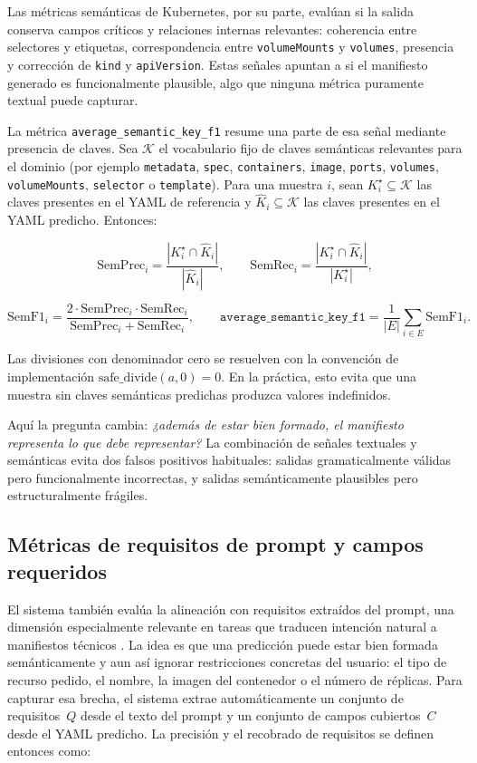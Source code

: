 Las métricas semánticas de Kubernetes, por su parte, evalúan si la salida conserva campos críticos y relaciones internas relevantes: coherencia entre
selectores y etiquetas, correspondencia entre \texttt{volumeMounts} y \texttt{volumes}, presencia y corrección de \texttt{kind} y \texttt{apiVersion}.
Estas señales apuntan a si el manifiesto generado es funcionalmente plausible, algo que ninguna métrica puramente textual puede capturar.

La métrica \texttt{average\_semantic\_key\_f1} resume una parte de esa señal mediante presencia de claves. Sea \(\mathcal{K}\) el vocabulario fijo de claves semánticas relevantes
para el dominio (por ejemplo \texttt{metadata}, \texttt{spec}, \texttt{containers}, \texttt{image}, \texttt{ports}, \texttt{volumes}, \texttt{volumeMounts},
\texttt{selector} o \texttt{template}). Para una muestra \(i\), sean \(K_i^\star \subseteq \mathcal{K}\) las claves presentes en el YAML de referencia y
\(\widehat{K}_i \subseteq \mathcal{K}\) las claves presentes en el YAML predicho. Entonces:

\[
\mathrm{SemPrec}_i = \frac{|K_i^\star \cap \widehat{K}_i|}{|\widehat{K}_i|}, \qquad
\mathrm{SemRec}_i = \frac{|K_i^\star \cap \widehat{K}_i|}{|K_i^\star|},
\]

\[
\mathrm{SemF1}_i =
\frac{2 \cdot \mathrm{SemPrec}_i \cdot \mathrm{SemRec}_i}
{\mathrm{SemPrec}_i + \mathrm{SemRec}_i},
\qquad
\texttt{average\_semantic\_key\_f1}
= \frac{1}{|E|}\sum_{i \in E}\mathrm{SemF1}_i.
\]

Las divisiones con denominador cero se resuelven con la convención de implementación \(\mathrm{safe\_divide}(a,0)=0\). En la práctica, esto evita que una muestra sin claves
semánticas predichas produzca valores indefinidos.

Aquí la pregunta cambia: \textit{¿además de estar bien formado, el manifiesto representa lo que debe representar?} La combinación de señales
textuales y semánticas evita dos falsos positivos habituales: salidas gramaticalmente válidas pero funcionalmente incorrectas, y salidas
semánticamente plausibles pero estructuralmente frágiles.

\subsection{Métricas de requisitos de prompt y campos requeridos}
\label{sec:ch4_metrics_prompt}

El sistema también evalúa la alineación con requisitos extraídos del prompt, una dimensión especialmente relevante en tareas que traducen intención natural a manifiestos
técnicos \citep{ueno2024migrating, angi2025kgen}. La idea es que una predicción puede estar bien formada semánticamente
y aun así ignorar restricciones concretas del usuario: el tipo de recurso pedido, el nombre, la imagen del contenedor o el número de réplicas.
Para capturar esa brecha, el sistema extrae automáticamente un conjunto de requisitos~$Q$ desde el texto del prompt y un conjunto de
campos cubiertos~$C$ desde el YAML predicho. La precisión y el recobrado de requisitos se definen entonces como:

